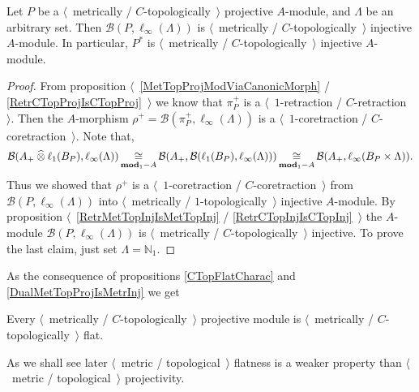 \begin{proposition}\label{DualMetTopProjIsMetrInj} Let $P$ be a $\langle$~metrically / $C$-topologically~$\rangle$ projective $A$-module, and $\Lambda$ be an arbitrary set. Then $\mathcal{B}(P,\ell_\infty(\Lambda))$ is $\langle$~metrically / $C$-topologically~$\rangle$ injective $A$-module. In particular, $P^*$ is $\langle$~metrically / $C$-topologically~$\rangle$ injective $A$-module.
\end{proposition}
\begin{proof} From proposition $\langle$~\ref{MetTopProjModViaCanonicMorph} / \ref{RetrCTopProjIsCTopProj}~$\rangle$ we know that $\pi_P^+$ is a $\langle$~$1$-retraction / $C$-retraction~$\rangle$. Then the $A$-morphism $\rho^+=\mathcal{B}(\pi_P^+,\ell_\infty(\Lambda))$ is a $\langle$~$1$-coretraction / $C$-coretraction~$\rangle$. Note that, 
$$
\mathcal{B}(A_+\mathbin{\widehat{\otimes}}\ell_1(B_P),\ell_\infty(\Lambda))\mathop{\mathbin{\cong}}\limits_{\mathbf{mod}_1-A}\mathcal{B}(A_+,\mathcal{B}(\ell_1(B_P),\ell_\infty(\Lambda)))\mathop{\mathbin{\cong}}\limits_{\mathbf{mod}_1-A}\mathcal{B}(A_+,\ell_\infty(B_P\times\Lambda)).
$$ 
Thus we showed that $\rho^+$ is a $\langle$~$1$-coretraction / $C$-coretraction~$\rangle$ from $\mathcal{B}(P,\ell_\infty(\Lambda))$ into $\langle$~metrically / $1$-topologically~$\rangle$ injective $A$-module. By proposition $\langle$~\ref{RetrMetTopInjIsMetTopInj} / \ref{RetrCTopInjIsCTopInj}~$\rangle$ the $A$-module $\mathcal{B}(P,\ell_\infty(\Lambda))$ is $\langle$~metrically / $C$-topologically~$\rangle$ injective. To prove the last claim, just set $\Lambda=\mathbb{N}_1$.
\end{proof}

As the consequence of propositions \ref{CTopFlatCharac} and \ref{DualMetTopProjIsMetrInj} we get

\begin{proposition}\label{MetTopProjIsMetTopFlat} Every $\langle$~metrically / $C$-topologically~$\rangle$ projective module is $\langle$~metrically / $C$-topologically~$\rangle$ flat.
\end{proposition}

As we shall see later $\langle$~metric / topological~$\rangle$ flatness is a weaker property than $\langle$~metric / topological~$\rangle$ projectivity.

